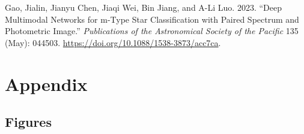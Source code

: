 \documentclass[
  11pt,
]{article}
\newlength{\cslhangindent}
\newlength{\cslentryspacingunit} %
\newenvironment{CSLReferences}[2] %
 {%
  \setlength{\parindent}{0pt}
  \ifodd #1
  \let\oldpar\par
  \def\par{\hangindent=\cslhangindent\oldpar}
  \fi
  \setlength{\parskip}{#2\cslentryspacingunit}
 }%
 {}
\begin{document}
\hypertarget{refs}{}
\begin{CSLReferences}{1}{0}
\leavevmode{}%
Gao, Jialin, Jianyu Chen, Jiaqi Wei, Bin Jiang, and A-Li Luo. 2023. {``Deep Multimodal Networks for m-Type Star Classification with Paired Spectrum and Photometric Image.''} \emph{Publications of the Astronomical Society of the Pacific} 135 (May): 044503. \url{https://doi.org/10.1088/1538-3873/acc7ca}.

\end{CSLReferences}




\newpage

\hypertarget{appendix}{%
\section{Appendix}\label{appendix}}

\hypertarget{figures}{%
\subsection{Figures}\label{figures}}
\end{document}
